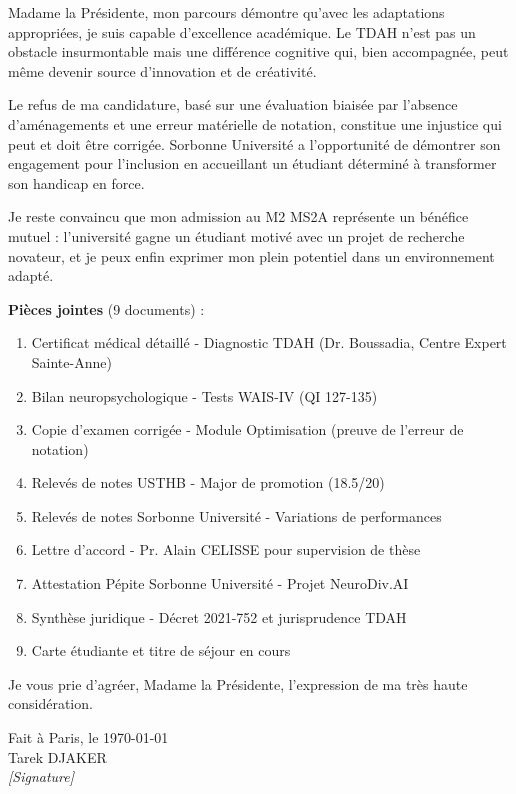 \documentclass[12pt,french,a4paper]{article}
\begin{document}
Madame la Présidente, mon parcours démontre qu'avec les adaptations appropriées, je suis capable d'excellence académique. Le TDAH n'est pas un obstacle insurmontable mais une différence cognitive qui, bien accompagnée, peut même devenir source d'innovation et de créativité.

Le refus de ma candidature, basé sur une évaluation biaisée par l'absence d'aménagements et une erreur matérielle de notation, constitue une injustice qui peut et doit être corrigée. Sorbonne Université a l'opportunité de démontrer son engagement pour l'inclusion en accueillant un étudiant déterminé à transformer son handicap en force.

Je reste convaincu que mon admission au M2 MS2A représente un bénéfice mutuel : l'université gagne un étudiant motivé avec un projet de recherche novateur, et je peux enfin exprimer mon plein potentiel dans un environnement adapté.

\vspace{1cm}

\noindent\textbf{Pièces jointes} (9 documents) :
\begin{enumerate}[leftmargin=2cm]
\item Certificat médical détaillé - Diagnostic TDAH (Dr. Boussadia, Centre Expert Sainte-Anne)
\item Bilan neuropsychologique - Tests WAIS-IV (QI 127-135)
\item Copie d'examen corrigée - Module Optimisation (preuve de l'erreur de notation)
\item Relevés de notes USTHB - Major de promotion (18.5/20)
\item Relevés de notes Sorbonne Université - Variations de performances
\item Lettre d'accord - Pr. Alain CELISSE pour supervision de thèse
\item Attestation Pépite Sorbonne Université - Projet NeuroDiv.AI
\item Synthèse juridique - Décret 2021-752 et jurisprudence TDAH
\item Carte étudiante et titre de séjour en cours
\end{enumerate}

\vspace{2cm}

\noindent Je vous prie d'agréer, Madame la Présidente, l'expression de ma très haute considération.

\vspace{2cm}

\begin{flushright}
\begin{minipage}{0.4\textwidth}
\centering
Fait à Paris, le \today\\
\vspace{2cm}
Tarek DJAKER\\
\textit{[Signature]}
\end{minipage}
\end{flushright}
\end{document}
